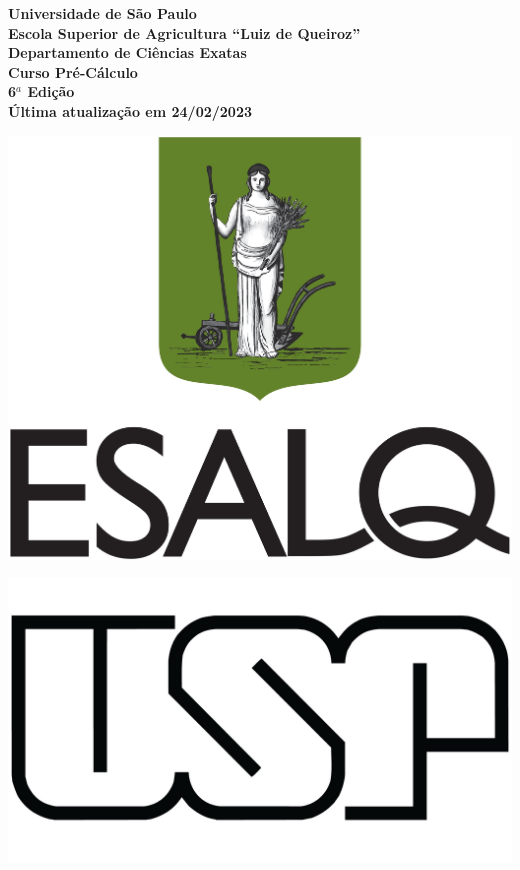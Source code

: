 \vspace{2cm}
\begin{center}
	\bfseries \LARGE Universidade de São Paulo\\
	\vspace{1cm}
	\bfseries \Large Escola Superior de Agricultura ``Luiz de Queiroz''\\
	\vspace{1cm}
	\bfseries \Large Departamento de Ciências Exatas\\
	\vspace{5cm}
	\bfseries {\fontsize{32}{32}\selectfont Curso Pré-Cálculo}\\[0.5cm]
	\bfseries  \huge{\textbf{6$^a$ Edição}}\\
	\vspace{3cm}
	\normalsize{Última atualização em 24/02/2023}\\
	\vspace{5.5cm}
	\begin{minipage}[t]{.45\textwidth}
	    \raggedleft
        \includegraphics[width=0.3\linewidth]{Figuras/brasao_esalq1.jpg}\hspace{0.5cm}
    \end{minipage}
    \begin{minipage}[t]{.45\textwidth}
        \raggedright
        \hspace{0.5cm}\includegraphics[width=0.35\linewidth]{Figuras/usp_logo.jpg}
    \end{minipage}
\end{center}
